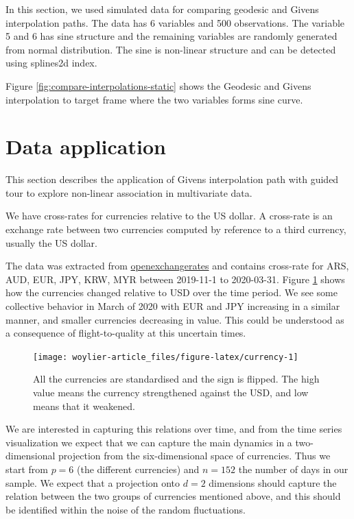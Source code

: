In this section, we used simulated data for comparing geodesic and
Givens interpolation paths. The data has 6 variables and 500
observations. The variable 5 and 6 has sine structure and the remaining
variables are randomly generated from normal distribution. The sine is
non-linear structure and can be detected using splines2d index.

Figure \ref{fig:compare-interpolations-static} shows the Geodesic and
Givens interpolation to target frame where the two variables forms sine
curve.

\hypertarget{data-application}{%
\section{Data application}\label{data-application}}

This section describes the application of Givens interpolation path with
guided tour to explore non-linear association in multivariate data.

We have cross-rates for currencies relative to the US dollar. A
cross-rate is an exchange rate between two currencies computed by
reference to a third currency, usually the US dollar.

The data was extracted from
\href{https://openexchangerates.org}{openexchangerates} and contains
cross-rate for ARS, AUD, EUR, JPY, KRW, MYR between 2019-11-1 to
2020-03-31. Figure \ref{fig:currency} shows how the currencies changed
relative to USD over the time period. We see some collective behavior in
March of 2020 with EUR and JPY increasing in a similar manner, and
smaller currencies decreasing in value. This could be understood as a
consequence of flight-to-quality at this uncertain times.

\begin{Schunk}
\begin{figure}
\texttt{[image: woylier-article\_files/figure-latex/currency-1]} \caption[All the currencies are standardised and the sign is flipped]{All the currencies are standardised and the sign is flipped. The high value means the currency strengthened against the USD, and low means that it weakened.}\label{fig:currency}
\end{figure}
\end{Schunk}

We are interested in capturing this relations over time, and from the
time series visualization we expect that we can capture the main
dynamics in a two-dimensional projection from the six-dimensional space
of currencies. Thus we start from \(p=6\) (the different currencies) and
\(n=152\) the number of days in our sample. We expect that a projection
onto \(d=2\) dimensions should capture the relation between the two
groups of currencies mentioned above, and this should be identified
within the noise of the random fluctuations.

